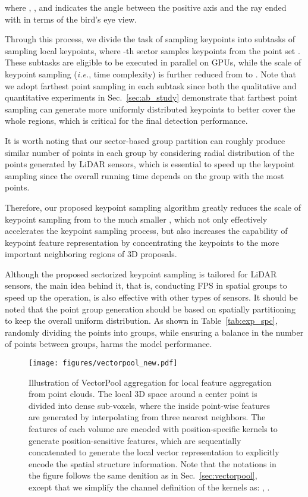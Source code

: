 \documentclass[natbib,twocolumn]{svjour3}          \smartqed  \usepackage{graphicx}
\begin{document}
where , 
, and    indicates the angle between the positive  axis and the ray ended with  in terms of the bird's eye view.

Through this process, we divide the task of sampling  keypoints into  subtasks of sampling local keypoints, where -th sector samples  keypoints from the point set . These subtasks are eligible to be executed in parallel on GPUs, while the scale of keypoint sampling (\emph{i.e.}, time complexity) is further reduced from  to .
Note that we adopt farthest point sampling in each subtask since both the qualitative and quantitative experiments in Sec.~\ref{sec:ab_study} demonstrate that farthest point sampling can  generate more uniformly distributed keypoints to better cover the whole regions, which is critical for the final detection performance.

It is worth noting that our sector-based group partition can roughly produce similar number of points in each group by considering radial distribution of the points generated by LiDAR sensors, which is essential to speed up the keypoint sampling since the overall running time depends on the group with the most points. 


Therefore, our proposed keypoint sampling algorithm greatly reduces the scale of keypoint sampling from  to the much smaller , which not only effectively accelerates the keypoint sampling process, but also increases the capability of keypoint feature representation by concentrating the keypoints to the more important neighboring regions of 3D proposals. 


Although the proposed sectorized keypoint sampling is tailored for LiDAR sensors, the main idea behind it, that is, conducting
FPS in spatial groups to speed up the operation, is also effective with other types of sensors.  It should be noted that the point group generation should be based on
spatially partitioning to keep the overall uniform distribution. As shown in Table~\ref{tab:exp_spc}, randomly dividing the points
into groups, while ensuring a balance in the number of points between groups, harms the model
performance.


\begin{figure*}
	\begin{center}
		\texttt{[image: figures/vectorpool\_new.pdf]}
	\end{center}
	\vspace{-2mm}
	\caption{Illustration of VectorPool aggregation for local feature aggregation from point clouds. The local 3D space around a center point is divided into dense sub-voxels, where the inside point-wise features are generated by interpolating from three nearest neighbors. 
		The features of each volume are encoded with position-specific kernels to generate position-sensitive features, which are sequentially concatenated to generate the local vector representation to explicitly encode the spatial structure information.
		Note that the notations in the figure follows the same denition as in Sec.~\ref{sec:vectorpool}, except that we simplify the channel definition of the kernels as: , .
	}
	\label{fig:vectorpool}
\end{figure*}
\end{document}
